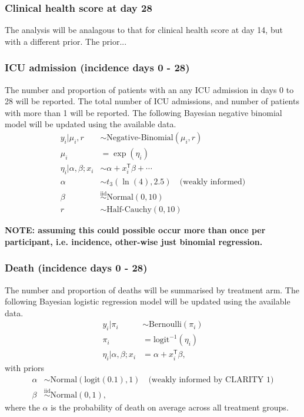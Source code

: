 \documentclass[11pt,parskip=full-]{scrartcl}
\begin{document}
\subsubsection{Clinical health score at day 28}
The analysis will be analagous to that for clinical health score at day 14, but with a different prior. The prior...

\subsubsection{ICU admission (incidence days 0 - 28)}
The number and proportion of patients with an any ICU admission in days 0 to 28 will be reported. The total number of ICU admissions, and number of patients with more than 1 will be reported. The following Bayesian negative binomial model will be updated using the available data.
$$
    \begin{aligned}
        y_i|\mu_i,r &\sim \text{Negative-Binomial}(\mu_i, r) \\
        \mu_i &= \exp(\eta_i) \\
        \eta_i | \alpha, \beta; x_i &\sim \alpha + x_i^\mathsf{T}\beta + \cdots \\
        \alpha &\sim t_3(\ln(4), 2.5) \quad \text{(weakly informed)} \\
        \beta &\overset{\text{iid}}{\sim} \text{Normal}(0, 10) \\
        r &\sim \text{Half-Cauchy}(0, 10)
    \end{aligned}
$$

\textbf{NOTE: assuming this could possible occur more than once per participant, i.e. incidence, other-wise just binomial regression.}

\subsubsection{Death (incidence days 0 - 28)}
The number and proportion of deaths will be summarised by treatment arm. The following Bayesian logistic regression model will be updated using the available data.
$$
    \begin{aligned}
        y_i | \pi_i              & \sim \text{Bernoulli}(\pi_i)    \\
        \pi_i                    & = \text{logit}^{-1}(\eta_i)     \\
        \eta_i|\alpha,\beta; x_i & = \alpha + x_i^\mathsf{T}\beta,
    \end{aligned}
$$
with priors
$$
    \begin{aligned}
        \alpha & \sim \text{Normal}(\text{logit}(0.1), 1) \quad \text{(weakly informed by CLARITY 1)} \\
        \beta &\overset{\text{iid}}{\sim} \text{Normal}(0, 1),
    \end{aligned}
$$
where the $\alpha$ is the probability of death on average across all treatment groups.
\end{document}
